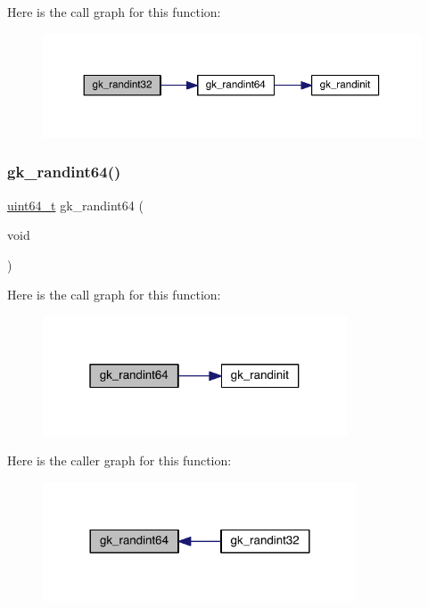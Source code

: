 Here is the call graph for this function\+:\nopagebreak
\begin{figure}[H]
\begin{center}
\leavevmode
\includegraphics[width=350pt]{a00131_a8e801d60d0dbdf0213d39cf210cddf11_cgraph}
\end{center}
\end{figure}
\mbox{\label{a00131_a2a2322fc19f0dfd85b92cf6325c743a2}} 
\subsubsection{\texorpdfstring{gk\+\_\+randint64()}{gk\_randint64()}}
{\footnotesize\ttfamily \hyperlink{a00119_aec6fcb673ff035718c238c8c9d544c47}{uint64\+\_\+t} gk\+\_\+randint64 (\begin{DoxyParamCaption}\item[{void}]{ }\end{DoxyParamCaption})}

Here is the call graph for this function\+:\nopagebreak
\begin{figure}[H]
\begin{center}
\leavevmode
\includegraphics[width=256pt]{a00131_a2a2322fc19f0dfd85b92cf6325c743a2_cgraph}
\end{center}
\end{figure}
Here is the caller graph for this function\+:\nopagebreak
\begin{figure}[H]
\begin{center}
\leavevmode
\includegraphics[width=264pt]{a00131_a2a2322fc19f0dfd85b92cf6325c743a2_icgraph}
\end{center}
\end{figure}
